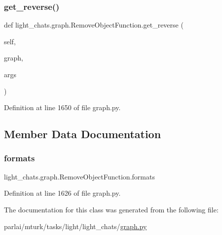 \subsubsection{\texorpdfstring{get\+\_\+reverse()}{get\_reverse()}}
{\footnotesize\ttfamily def light\+\_\+chats.\+graph.\+Remove\+Object\+Function.\+get\+\_\+reverse (\begin{DoxyParamCaption}\item[{}]{self,  }\item[{}]{graph,  }\item[{}]{args }\end{DoxyParamCaption})}



Definition at line 1650 of file graph.\+py.



\subsection{Member Data Documentation}
\mbox{\label{classlight__chats_1_1graph_1_1RemoveObjectFunction_a67165948c1e8f963e79aac98baf91509}} 
\subsubsection{\texorpdfstring{formats}{formats}}
{\footnotesize\ttfamily light\+\_\+chats.\+graph.\+Remove\+Object\+Function.\+formats}



Definition at line 1626 of file graph.\+py.



The documentation for this class was generated from the following file\+:\begin{DoxyCompactItemize}
\item 
parlai/mturk/tasks/light/light\+\_\+chats/\hyperlink{parlai_2mturk_2tasks_2light_2light__chats_2graph_8py}{graph.\+py}\end{DoxyCompactItemize}
